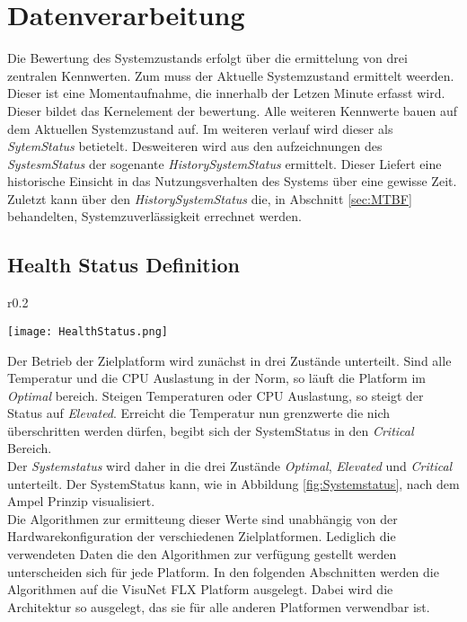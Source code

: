 \section{Datenverarbeitung}\label{sec:Datenverarbeitung}
Die Bewertung des Systemzustands erfolgt über die ermittelung von drei zentralen Kennwerten. Zum muss der Aktuelle Systemzustand ermittelt weerden. Dieser ist eine Momentaufnahme, die innerhalb der Letzen Minute erfasst wird. Dieser bildet das Kernelement der bewertung. Alle weiteren Kennwerte bauen auf dem Aktuellen Systemzustand auf. Im weiteren verlauf wird dieser als \textit{SytemStatus} betietelt. Desweiteren wird aus den aufzeichnungen des \textit{SystesmStatus} der sogenante \textit{HistorySystemStatus} ermittelt. Dieser Liefert eine historische Einsicht in das Nutzungsverhalten des Systems über eine gewisse Zeit. Zuletzt kann über den \textit{HistorySystemStatus} die, in Abschnitt \ref{sec:MTBF} behandelten, Systemzuverlässigkeit errechnet werden.

\newpage
\subsection{Health Status Definition}
\begin{wrapfigure}{r}{0.2\textwidth}
    \vspace{-1.2cm}
    \begin{center}
      \texttt{[image: HealthStatus.png]}
    \end{center}
    \vspace{-0.5cm}
    \caption{}
    \label{fig:Systemstatus}
    \vspace{-0.5cm}
\end{wrapfigure}
Der Betrieb der Zielplatform wird zunächst in drei Zustände unterteilt. Sind alle Temperatur und die CPU Auslastung in der Norm, so läuft die Platform im \textit{Optimal} bereich. Steigen Temperaturen oder CPU Auslastung, so steigt der Status auf \textit{Elevated}. Erreicht die Temperatur nun grenzwerte die nich überschritten werden dürfen, begibt sich der SystemStatus in den \textit{Critical} Bereich.\\
Der \textit{Systemstatus} wird daher in die drei Zustände \textit{Optimal}, \textit{Elevated} und \textit{Critical} unterteilt. Der SystemStatus kann, wie in  Abbildung \ref{fig:Systemstatus}, nach dem Ampel Prinzip visualisiert.\\
Die Algorithmen zur ermitteung dieser Werte sind unabhängig von der Hardwarekonfiguration der verschiedenen Zielplatformen. Lediglich die verwendeten Daten die den Algorithmen zur verfügung gestellt werden unterscheiden sich für jede Platform. In den folgenden Abschnitten werden die Algorithmen auf die VisuNet FLX Platform ausgelegt. Dabei wird die Architektur so ausgelegt, das sie für alle anderen Platformen verwendbar ist.
  
